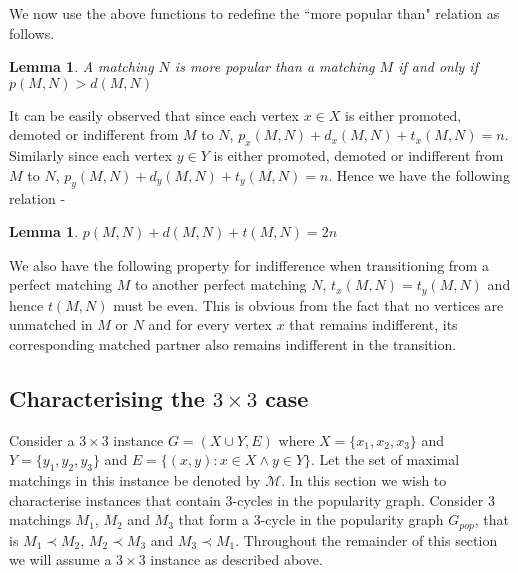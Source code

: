 \documentclass[a4paper,10pt]{article}
\theoremstyle{plain} %
\newtheorem{lemma}[theorem]{Lemma} %
\theoremstyle{plain} %
\begin{document}
We now use the above functions to redefine the ``more popular than" relation as follows.

\begin{lemma}
    A matching $N$ is more popular than a matching $M$ if and only if $p(M, N) > d(M, N)$
\end{lemma}

It can be easily observed that since each vertex $x \in X$ is either promoted, demoted or indifferent from $M$ to $N$, $p_x(M, N) + d_x(M, N) + t_x(M, N) = n$. Similarly since each vertex $y \in Y$ is either promoted, demoted or indifferent from $M$ to $N$, $p_y(M, N) + d_y(M, N) + t_y(M, N) = n$. Hence we have the following relation -
\begin{lemma}
    $p(M, N) + d(M, N) + t(M, N) = 2n$
\end{lemma}

We also have the following property for indifference when transitioning from a perfect matching $M$ to another perfect matching $N$, $t_x(M, N) = t_y(M, N)$ and hence $t(M, N)$ must be even. This is obvious from the fact that no vertices are unmatched in $M$ or $N$ and for every vertex $x$ that remains indifferent, its corresponding matched partner also remains indifferent in the transition.


\subsection{Characterising the $3 \times 3$ case}
Consider a $3 \times 3$ instance $G = (X \cup Y, E)$ where $X = \{x_1, x_2, x_3\}$ and $Y = \{y_1, y_2, y_3\}$ and $E = \{(x, y): x \in X \land y \in Y\}$. Let the set of maximal matchings in this instance be denoted by $\mathcal{M}$. In this section we wish to characterise instances that contain 3-cycles in the popularity graph. Consider 3 matchings $M_1$, $M_2$ and $M_3$ that form a 3-cycle in the popularity graph $G_{pop}$, that is $M_1 \prec M_2$, $M_2 \prec M_3$ and $M_3 \prec M_1$. Throughout the remainder of this section we will assume a $3 \times 3$ instance as described above.

\end{document}
